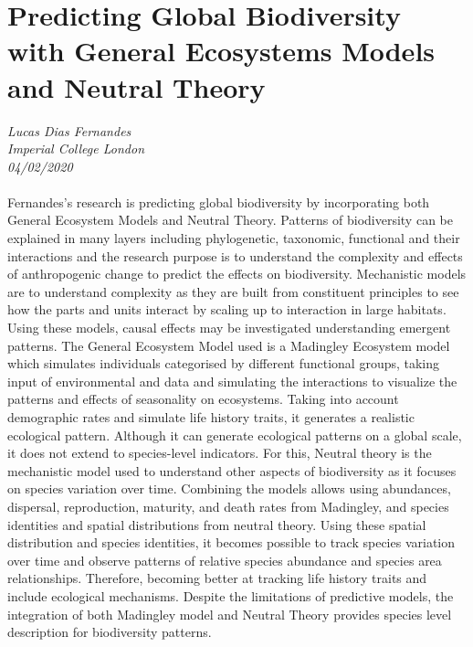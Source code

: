 \documentclass[11pt]{article}
\begin{document}
\section{Predicting Global Biodiversity with General Ecosystems Models and Neutral Theory}
\textit{Lucas Dias Fernandes\\Imperial College London\\04/02/2020}
\\
\\Fernandes’s research is predicting global biodiversity by incorporating both General Ecosystem Models and Neutral Theory. Patterns of biodiversity can be explained in many layers including phylogenetic, taxonomic, functional and their interactions and the research purpose is to understand the complexity and effects of anthropogenic change to predict the effects on biodiversity. Mechanistic models are to understand complexity as they are built from constituent principles to see how the parts and units interact by scaling up to interaction in large habitats. Using these models, causal effects may be investigated understanding emergent patterns. The General Ecosystem Model used is a Madingley Ecosystem model which simulates individuals categorised by different functional groups, taking input of environmental and data and simulating the interactions to visualize the patterns and effects of seasonality on ecosystems. Taking into account demographic rates and simulate life history traits, it generates a realistic ecological pattern. Although it can generate ecological patterns on a global scale, it does not extend to species-level indicators. For this, Neutral theory is the mechanistic model used to understand other aspects of biodiversity as it focuses on species variation over time. Combining the models allows using abundances, dispersal, reproduction, maturity, and death rates from Madingley, and species identities and spatial distributions from neutral theory. Using these spatial distribution and species identities, it becomes possible to track species variation over time and observe patterns of relative species abundance and species area relationships. Therefore, becoming better at tracking life history traits and include ecological mechanisms. Despite the limitations of predictive models, the integration of both Madingley model and Neutral Theory provides species level description for biodiversity patterns.
\end{document}
